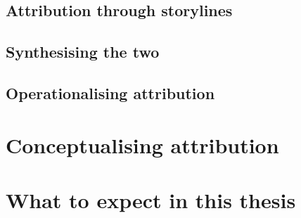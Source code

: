 
  \subsection{Attribution through storylines}

    \blindtext

  \subsection{Synthesising the two}

  \subsection{Operationalising attribution}

\section{Conceptualising attribution}

  \blindtext

\section{What to expect in this thesis}

  \blindtext
